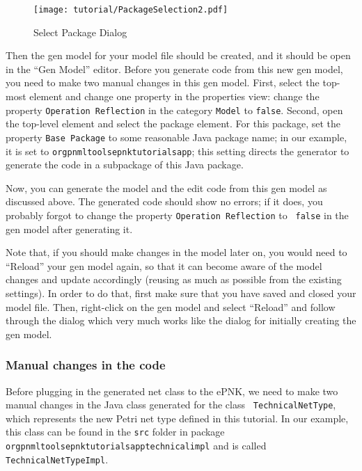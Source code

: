 \begin{figure}[hbtp!!]
  \centerline{\texttt{[image: tutorial/PackageSelection2.pdf]}}
  \caption{Select Package Dialog}
  \label{fig:tutorial:technical:pntd:gen-model-select-package2}
\end{figure}

Then the gen model for your model file should be created, and it should be open
in the ``Gen Model'' editor. Before you generate code from this new gen model,
you need to make two manual changes in this gen model. First, select the
top-most element and change one property in the properties view: change the property
{\tt Operation Reflection} in the category {\tt Model} to {\tt false}. Second,
open the top-level element and select the package element. For this package,
set the property {\tt Base Package} to some reasonable Java package name;
in our example, it is set to
{\tt org\qnsep{}pnml\qnsep{}tools\qnsep{}epnk\qnsep{}tutorials\qnsep{}app};
this setting directs the generator to generate the code in a
subpackage of this Java package.

Now, you can generate the model and the edit code from this gen model as
discussed above. The generated code should show no errors; if it does, you
probably forgot to change the property {\tt Operation Reflection} to {\tt
false} in the gen model after generating it.

Note that, if you should make changes in the model later on, you would need
to ``Reload'' your gen model again, so that it can become aware of the model
changes and update accordingly (reusing as much as possible from the existing
settings). In order to do that, first make sure that you have saved and closed
your model file. Then, right-click on the gen model and select ``Reload'' and
follow through the dialog which very much works like the dialog for
initially creating the gen model.

\subsubsection{Manual changes in the code}
\label{subsec:tutorial:technical:pntd:code-manual}

Before plugging in the generated net class to the ePNK, we need to make
two manual changes in the Java class generated for the class {\tt
TechnicalNetType}, which represents the new Petri net type defined in this
tutorial. In our example, this class can be found in the {\tt src} folder in
package {\tt
org\qnsep{}pnml\qnsep{}tools\qnsep{}epnk\qnsep{}tutorials\qnsep{}app\qnsep{}technical\qnsep{}impl}
and is called {\tt TechnicalNetType\optsep{}Impl}.

